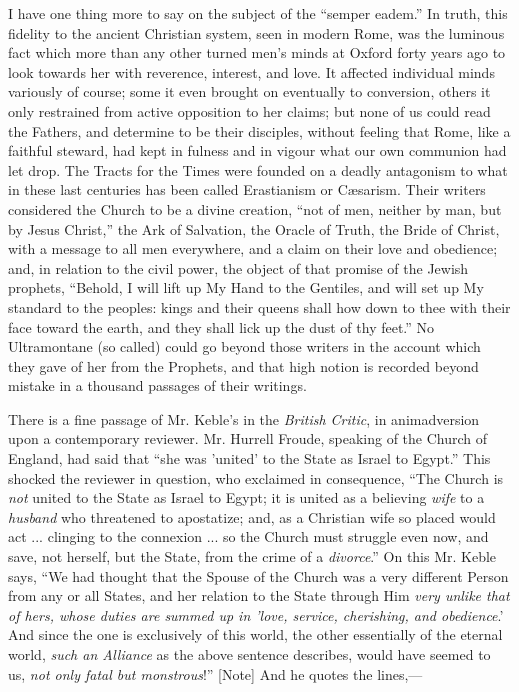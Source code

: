 I have one thing more to say on the subject of the ``semper eadem.''
In truth, this fidelity to the ancient Christian system, seen in modern
Rome, was the luminous fact which more than any other turned men's minds
at Oxford forty years ago to look towards her with reverence, interest,
and love. It affected individual minds variously of course; some it even
brought on eventually to conversion, others it only restrained from
active opposition to her claims; but none of us could read the Fathers,
and determine to be their disciples, without feeling that Rome, like a
faithful steward, had kept in fulness and in vigour what our own
communion had let drop. The Tracts for the Times were founded on a
deadly antagonism to what in these last centuries has been called
Erastianism or Cæsarism. Their writers considered the Church to be a
divine creation, ``not of men, neither by man, but by Jesus
Christ,'' the Ark of Salvation, the Oracle of Truth, the Bride of
Christ, with a message to all men everywhere, and a claim on their love
and obedience; and, in relation to the civil power, the object of that
promise of the Jewish prophets, ``Behold, I will lift up My Hand to
the Gentiles, and will set up My standard to the peoples: kings and
their queens shall how down to thee with their face toward the earth,
and they shall lick up the dust of thy feet.'' No Ultramontane (so
called) could go beyond those writers in the account which they
gave of her from the Prophets, and that high notion is recorded beyond
mistake in a thousand passages of their writings.

There is a fine passage of Mr. Keble's in the \emph{British Critic},
in animadversion upon a contemporary reviewer. Mr. Hurrell Froude,
speaking of the Church of England, had said that ``she was 'united'
to the State as Israel to Egypt.'' This shocked the reviewer in
question, who exclaimed in consequence, ``The Church is \emph{not} united
to the State as Israel to Egypt; it is united as a believing \emph{wife}
to a \emph{husband} who threatened to apostatize; and, as a Christian
wife so placed would act ... clinging to the connexion ... so the Church
must struggle even now, and save, not herself, but the State, from the
crime of a \emph{divorce}.'' On this Mr. Keble says, ``We had
thought that the Spouse of the Church was a very different Person from
any or all States, and her relation to the State through Him \emph{very
unlike that of hers, whose duties are summed up in 'love, service,
cherishing, and obedience}.' And since the one is exclusively of this
world, the other essentially of the eternal world, \emph{such an Alliance}
as the above sentence describes, would have seemed to us, \emph{not only fatal
but monstrous}!'' [Note] And he
quotes the lines,—

